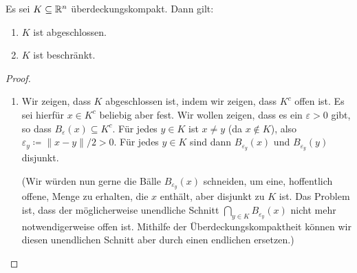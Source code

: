 \documentclass[a4paper,10pt]{article}
\begin{document}
\begin{lem}\label{lem: Überdeckungskompakt abgeschlossen und beschränkt}
 Es sei $K \subseteq \mathbb{R}^n$ überdeckungskompakt. Dann gilt:
 \begin{enumerate}
  \item
   $K$ ist abgeschlossen.
  \item
   $K$ ist beschränkt.
 \end{enumerate}
\end{lem}
\begin{proof}
 \begin{enumerate}
  \item
   Wir zeigen, dass $K$ abgeschlossen ist, indem wir zeigen, dass $K^c$ offen ist. Es sei hierfür $x \in K^c$ beliebig aber fest. Wir wollen zeigen, dass es ein $\varepsilon > 0$ gibt, so dass $B_\varepsilon(x) \subseteq K^c$. Für jedes $y \in K$ ist $x \neq y$ (da $x \notin K$), also $\varepsilon_y \coloneqq \|x-y\|/2 > 0$. Für jedes $y \in K$ sind dann $B_{\varepsilon_y}(x)$ und $B_{\varepsilon_y}(y)$ disjunkt.
   
   (Wir würden nun gerne die Bälle $B_{\varepsilon_y}(x)$ schneiden, um eine, hoffentlich offene, Menge zu erhalten, die $x$ enthält, aber disjunkt zu $K$ ist. Das Problem ist, dass der möglicherweise unendliche Schnitt $\bigcap_{y \in K} B_{\varepsilon_y}(x)$ nicht mehr notwendigerweise offen ist. Mithilfe der Überdeckungskompaktheit können wir diesen unendlichen Schnitt aber durch einen endlichen ersetzen.)
   

\end{enumerate}
\end{proof}
\end{document}
